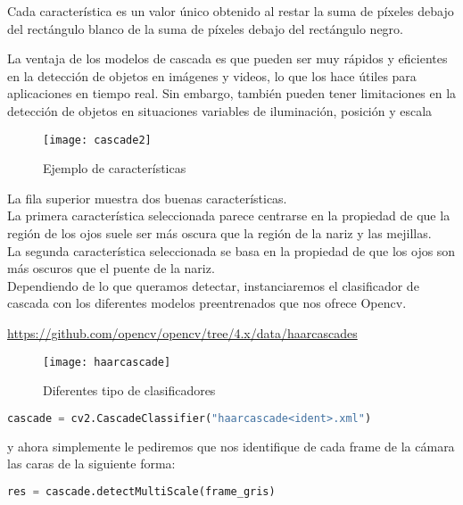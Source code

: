 Cada característica es un valor único obtenido al restar la suma de píxeles 
debajo del rectángulo blanco de la suma de píxeles debajo del rectángulo negro.

La ventaja de los modelos de cascada es que pueden ser muy rápidos y eficientes 
en la detección de objetos en imágenes y videos, lo que los hace útiles para 
aplicaciones en tiempo real. Sin embargo, también pueden tener limitaciones en 
la detección de objetos en situaciones variables de iluminación, posición y escala



\begin{figure}[H]
  \centering
  \texttt{[image: cascade2]}
  \caption{Ejemplo de características}\label{fig:ejemplo_característica}
\end{figure}

La fila superior muestra dos buenas características.\\
La primera característica seleccionada parece centrarse en la propiedad de 
que la región de los ojos suele ser más oscura que la región de la nariz y las mejillas.\\ 
La segunda característica seleccionada se basa en la propiedad de que los ojos son más 
oscuros que el puente de la nariz.\\


Dependiendo de lo que queramos detectar, instanciaremos el clasificador de 
cascada con los diferentes modelos preentrenados que nos ofrece Opencv.

\url{https://github.com/opencv/opencv/tree/4.x/data/haarcascades}

\begin{figure}[H]
  \centering
  \texttt{[image: haarcascade]}
  \caption{Diferentes tipo de clasificadores}\label{fig:ejemplo_característica}
\end{figure}



\begin{lstlisting}[language=Python]
  cascade = cv2.CascadeClassifier("haarcascade<ident>.xml")
\end{lstlisting}

y ahora simplemente le pediremos que nos identifique de cada frame de la cámara las caras de la siguiente forma:

\begin{lstlisting}[language=Python]
  res = cascade.detectMultiScale(frame_gris)
\end{lstlisting}

